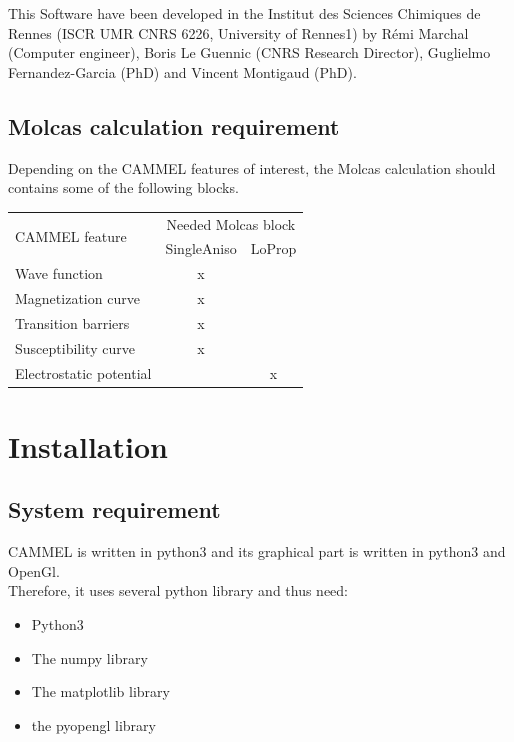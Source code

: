\documentclass[12pt,a4paper]{article}
\begin{document}
This Software have been developed in the Institut des Sciences Chimiques de Rennes (ISCR UMR CNRS 6226, University of Rennes1) by Rémi Marchal (Computer engineer), Boris Le Guennic (CNRS Research Director), Guglielmo Fernandez-Garcia (PhD) and Vincent Montigaud (PhD).

\subsection{Molcas calculation requirement}
Depending on the CAMMEL features of interest, the Molcas calculation should contains some of the following blocks.

\begin{table}[H]
\begin{center}
\begin{tabular}{|l|c|c|}
\hline
\multirow{2}{*}{CAMMEL feature} & \multicolumn{2}{|c|}{Needed Molcas block} \\
\cline{2-3}
 & SingleAniso & LoProp \\
\hline
Wave function  & x & \\
Magnetization curve & x & \\
Transition barriers & x & \\
Susceptibility curve & x & \\
Electrostatic potential  &  & x \\
\hline
\end{tabular}
\end{center}
\end{table}

\section{Installation}
\subsection{System requirement}
CAMMEL is written in python3 and its graphical part is written in python3 and OpenGl.\\

Therefore, it uses several python library and thus need:
\begin{itemize}
\item{Python3}
\item{The numpy library}
\item{The matplotlib library}
\item{the pyopengl library}
\end{itemize}
\end{document}
